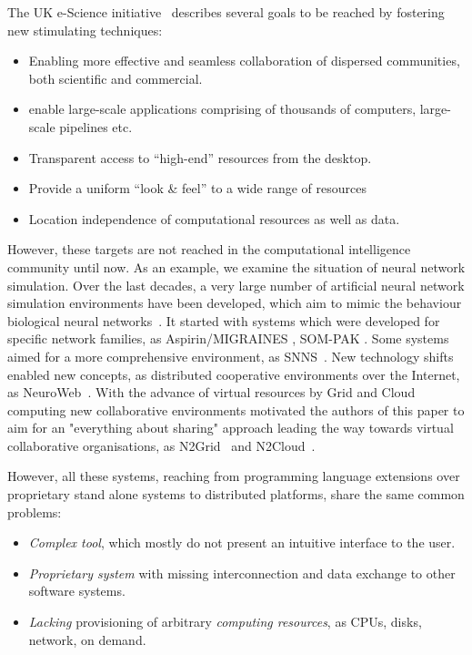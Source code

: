 \documentclass[conference]{IEEEtran}
\begin{document}
The UK e-Science initiative~\cite{UKeS} describes several
goals to be reached by fostering new stimulating techniques:

\begin{itemize}
  \item Enabling more effective and seamless collaboration of dispersed communities, both scientific and commercial.
  \item enable large-scale applications comprising of thousands of computers, large-scale pipelines etc.
  \item Transparent access to “high-end” resources from the desktop.
  \item Provide a uniform “look \& feel” to a wide range of resources
  \item Location independence of computational resources as well as data. 
\end{itemize}

However, these targets are not reached in the computational intelligence community until now.
As an example, we examine the situation of neural network simulation.
Over the last decades, a very large number of artificial neural network simulation environments have been developed, which aim to mimic the behaviour biological neural networks~\cite{prieto2016neural}. It started with systems which were developed for specific network families, as Aspirin/MIGRAINES
\cite{Lei91}, SOM-PAK \cite{som92}. Some systems aimed for a more comprehensive environment, as SNNS~\cite{Zel92}.
New technology shifts enabled new concepts, as distributed cooperative environments over the Internet, as NeuroWeb~\cite{schikuta2002neuroweb}.
With the advance of virtual resources by Grid and Cloud computing new collaborative environments motivated the authors of this paper to aim for an "everything about sharing" approach leading the way towards virtual collaborative organisations, as N2Grid~\cite{schikuta2004n2grid} and N2Cloud~\cite{huqqani2010n2cloud}.

However, all these systems, reaching from programming language extensions over proprietary stand alone systems to distributed platforms, share the
same common problems:

\begin{itemize}

\item  \emph{Complex tool}, which mostly do not present an intuitive interface to the user.
\item  \emph{Proprietary system} with missing interconnection and data exchange to other software systems.
\item  \emph{Lacking} provisioning of arbitrary \emph{computing resources}, as CPUs, disks, network, on demand.
\end{itemize}
\end{document}
